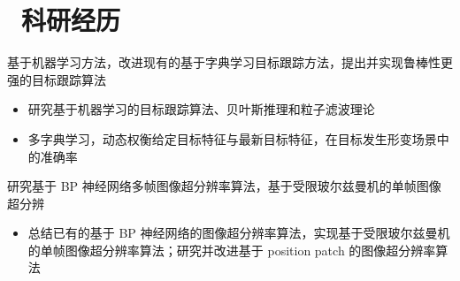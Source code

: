 \documentclass{resume}
\begin{document}


\section{\faUsers\ 科研经历}

\begin{onehalfspacing}
基于机器学习方法，改进现有的基于字典学习目标跟踪方法，提出并实现鲁棒性更强的目标跟踪算法
\begin{itemize}
  \item 研究基于机器学习的目标跟踪算法、贝叶斯推理和粒子滤波理论
  \item 多字典学习，动态权衡给定目标特征与最新目标特征，在目标发生形变场景中的准确率
\end{itemize}
\end{onehalfspacing}

\begin{onehalfspacing}
研究基于 BP 神经网络多帧图像超分辨率算法，基于受限玻尔兹曼机的单帧图像超分辨
\begin{itemize}
  \item 总结已有的基于 BP 神经网络的图像超分辨率算法，实现基于受限玻尔兹曼机的单帧图像超分辨率算法；研究并改进基于 position patch 的图像超分辨率算法
\end{itemize}
\end{onehalfspacing}
\end{document}
